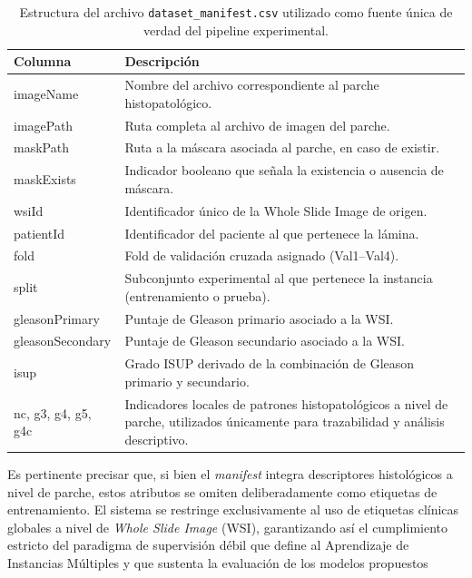 \newpage
\begin{table}[H]
    \centering
    \caption{Estructura del archivo \texttt{dataset\_manifest.csv} utilizado como fuente única de verdad del pipeline experimental.}
    \label{tab:dataset_manifest}
    \begin{tabular}{p{4cm} p{10cm}}
        \hline
        \textbf{Columna} & \textbf{Descripción} \\
        \hline
        imageName & Nombre del archivo correspondiente al parche histopatológico. \\
        imagePath & Ruta completa al archivo de imagen del parche. \\
        maskPath & Ruta a la máscara asociada al parche, en caso de existir. \\
        maskExists & Indicador booleano que señala la existencia o ausencia de máscara. \\
        wsiId & Identificador único de la Whole Slide Image de origen. \\
        patientId & Identificador del paciente al que pertenece la lámina. \\
        fold & Fold de validación cruzada asignado (Val1--Val4). \\
        split & Subconjunto experimental al que pertenece la instancia (entrenamiento o prueba). \\
        gleasonPrimary & Puntaje de Gleason primario asociado a la WSI. \\
        gleasonSecondary & Puntaje de Gleason secundario asociado a la WSI. \\
        isup & Grado ISUP derivado de la combinación de Gleason primario y secundario. \\
        nc, g3, g4, g5, g4c & Indicadores locales de patrones histopatológicos a nivel de parche, utilizados únicamente para trazabilidad y análisis descriptivo. \\
        \hline
    \end{tabular}
\end{table}

Es pertinente precisar que, si bien el \textit{manifest} integra descriptores histológicos a nivel de parche, estos atributos se omiten deliberadamente como etiquetas de entrenamiento. El sistema se restringe exclusivamente al uso de etiquetas clínicas globales a nivel de \textit{Whole Slide Image} (WSI), garantizando así el cumplimiento estricto del paradigma de supervisión débil que define al Aprendizaje de Instancias Múltiples y que sustenta la evaluación de los modelos propuestos

